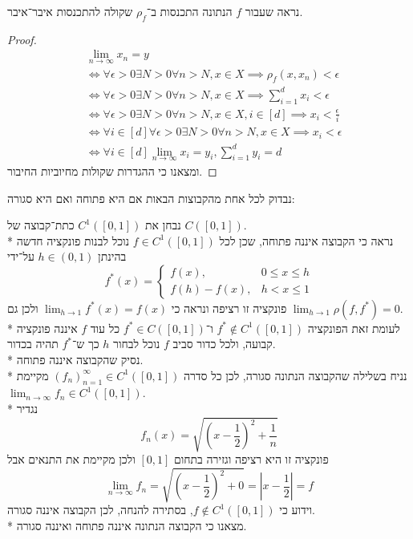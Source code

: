 \Subquestion{}
נראה שעבור $f$ הנתונה התכנסות ב־$\rho_f$ שקולה להתכנסות איבר־איבר.
\begin{proof}
	\begin{align*}
		& \lim_{n \to \infty} x_n = y \\
		& \iff \forall \epsilon > 0 \exists N > 0 \forall n > N, x \in X \implies \rho_f(x, x_n) < \epsilon \\
		& \iff \forall \epsilon > 0 \exists N > 0 \forall n > N, x \in X \implies \sum_{i = 1}^{d} x_i < \epsilon \\
		& \iff \forall \epsilon > 0 \exists N > 0 \forall n > N, x \in X, i \in [d] \implies x_i < \frac{\epsilon}{i} \\
		& \iff \forall i \in [d] \forall \epsilon > 0 \exists N > 0 \forall n > N, x \in X \implies x_i < \epsilon \\
		& \iff \forall i \in [d] \lim_{n \to \infty} x_i = y_i, \sum_{i = 1}^{d} y_i = d
	\end{align*}
	ומצאנו כי ההגדרות שקולות מחיוביות החיבור.
\end{proof}

\Question{}
נבדוק לכל אחת מהקבוצות הבאות אם היא פתוחה ואם היא סגורה:

\Subquestion{}
נבחן את $C^1([0, 1])$ כתת־קבוצה של $C([0, 1])$. \\*
נראה כי הקבוצה איננה פתוחה, שכן לכל $f \in C^1([0, 1])$ נוכל לבנות פונקציה חדשה בהינתן $h \in (0, 1)$ על־ידי
\[
	f^*(x) = \begin{cases}
		f(x), & 0 \le x \le h \\
		f(h) - f(x), & h < x \le 1
	\end{cases}
\]
פונקציה זו רציפה ונראה כי $\lim_{h \to 1} f^*(x) = f(x)$ ולכן גם $\lim_{h \to 1} \rho(f, f^*) = 0$. \\*
לעומת זאת הפונקציה $f^* \not\in C^1([0, 1])$ ו־$f^* \in C([0, 1])$ כל עוד $f$ איננה פונקציה קבועה, ולכל כדור סביב $f$ נוכל לבחור $h$ כך ש־$f^*$ תהיה בכדור. \\*
נסיק שהקבוצה איננה פתוחה. \\*
נניח בשלילה שהקבוצה הנתונה סגורה, לכן כל סדרה ${(f_n)}_{n = 1}^\infty \in C^1([0, 1])$ מקיימת $\lim_{n \to \infty} f_n \in C^1([0, 1])$. \\*
נגדיר
\[
	f_n(x) = \sqrt{{(x - \frac{1}{2})}^2 + \frac{1}{n}}
\]
פונקציה זו היא רציפה וגזירה בתחום $[0, 1]$ ולכן מקיימת את התנאים אבל
\[
	\lim_{n \to \infty} f_n = \sqrt{{(x - \frac{1}{2})}^2 + 0} = |x - \frac{1}{2}| = f
\]
וידוע כי $f \not\in C^1([0, 1])$, בסתירה להנחה, לכן הקבוצה איננה סגורה. \\*
מצאנו כי הקבוצה הנתונה איננה פתוחה ואיננה סגורה.

